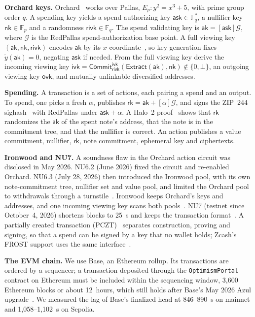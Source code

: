\documentclass[10pt,letterpaper]{article}
\makeatletter
\renewcommand\section{\@startsection{section}{1}{\z@}{-1.3em}{0.45em}{\normalfont\large\bfseries}}
\theoremstyle{plain}
\theoremstyle{definition}
\newcommand{\ak}{\mathsf{ak}}
\newcommand{\ask}{\mathsf{ask}}
\newcommand{\nk}{\mathsf{nk}}
\newcommand{\rivk}{\mathsf{rivk}}
\newcommand{\ivk}{\mathsf{ivk}}
\newcommand{\ovk}{\mathsf{ovk}}
\newcommand{\rk}{\mathsf{rk}}
\newcommand{\Gor}{\mathcal{G}}
\newcommand{\ytilde}{\tilde{y}}
\newcommand{\fn}[1]{\texttt{#1}}
\makeatother
\begin{document}
\section{Background}

\textbf{Orchard keys.} Orchard~\cite[\S4.2.3]{spec} works over Pallas,
$E_p: y^2 = x^3 + 5$, with prime group order $q$. A spending key yields a spend authorizing key
$\ask \in \mathbb{F}_q^*$, a nullifier key $\nk \in \mathbb{F}_p$ and a randomness
$\rivk \in \mathbb{F}_q$. The spend validating key is $\ak = [\ask]\Gor$, where $\Gor$ is the
RedPallas spend-authorization base point. A full viewing key $(\ak, \nk, \rivk)$ encodes $\ak$
by its $x$-coordinate~\cite[\S5.6.4.4]{spec}, so key generation fixes $\ytilde(\ak)=0$, negating
$\ask$ if needed. From the full viewing key derive the incoming viewing key
$\ivk = \mathsf{Commit}^{\ivk}_{\rivk}(\mathsf{Extract}(\ak),\nk) \notin \{0,\bot\}$, an outgoing
viewing key $\ovk$, and mutually unlinkable diversified addresses.

\textbf{Spending.} A transaction is a set of actions, each pairing a spend and an output. To
spend, one picks a fresh $\alpha$, publishes $\rk = \ak + [\alpha]\Gor$, and signs the ZIP~244
sighash~\cite{zip244} with RedPallas under $\ask + \alpha$. A Halo~2 proof~\cite{halo2} shows
that $\rk$ randomizes the $\ak$ of the spent note's address, that the note is in the commitment
tree, and that the nullifier is correct. An action publishes a value commitment, nullifier,
$\rk$, note commitment, ephemeral key and ciphertexts.

\textbf{Ironwood and NU7.} A soundness flaw in the Orchard action circuit was disclosed in May
2026. NU6.2 (June 2026) fixed the circuit and re-enabled Orchard. NU6.3 (July 28, 2026) then
introduced the Ironwood pool, with its own note-commitment tree, nullifier set and value pool, and
limited the Orchard pool to withdrawals through a turnstile~\cite{zip258}. Ironwood keeps Orchard's keys and addresses, and one incoming
viewing key scans both pools~\cite{zip326}. NU7 (testnet since October~4, 2026) shortens blocks to
25~s and keeps the transaction format~\cite{zip259}. A partially created transaction
(PCZT)~\cite{zip374} separates construction, proving and signing, so that a spend can be signed
by a key that no wallet holds; Zcash's FROST support uses the same interface~\cite{frost,zip312}.

\textbf{The EVM chain.} We use Base, an Ethereum rollup. Its transactions are ordered by a
sequencer; a transaction deposited through the \fn{OptimismPortal} contract on Ethereum must be
included within the sequencing window, 3{,}600 Ethereum blocks or about 12~hours, which still
holds after Base's May 2026 Azul upgrade~\cite{basereliab,opforced}. We measured the lag of
Base's finalized head at 846--890~s on mainnet and 1{,}058--1{,}102~s on Sepolia.
\end{document}
